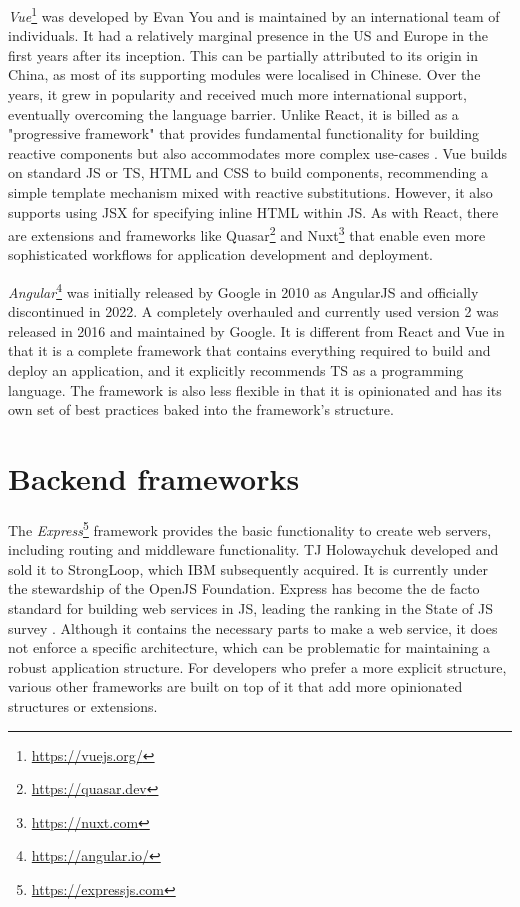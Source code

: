 \emph{Vue}\footnote{\url{https://vuejs.org/}} was developed by Evan You and is maintained by an international team of individuals. It had a relatively marginal presence in the US and Europe in the first years after its inception. This can be partially attributed to its origin in China, as most of its supporting modules were localised in Chinese. Over the years, it grew in popularity and received much more international support, eventually overcoming the language barrier. Unlike React, it is billed as a "progressive framework" that provides fundamental functionality for building reactive components but also accommodates more complex use-cases \parencite{vueProgressiveFramework}. Vue builds on standard \ac{JS} or \ac{TS}, \ac{HTML} and \ac{CSS} to build components, recommending a simple template mechanism mixed with reactive substitutions. However, it also supports using \ac{JSX} for specifying inline \ac{HTML} within \ac{JS}. As with React, there are extensions and frameworks like Quasar\footnote{\url{https://quasar.dev}} and Nuxt\footnote{\url{https://nuxt.com}} that enable even more sophisticated workflows for application development and deployment.

\emph{Angular}\footnote{\url{https://angular.io/}} was initially released by Google in 2010 as AngularJS and officially discontinued in 2022. A completely overhauled and currently used version 2 was released in 2016 and maintained by Google. It is different from React and Vue in that it is a complete framework that contains everything required to build and deploy an application, and it explicitly recommends \ac{TS} as a programming language. The framework is also less flexible in that it is opinionated and has its own set of best practices baked into the framework's structure.




\section{Backend frameworks}

The \emph{Express}\footnote{\url{https://expressjs.com}} framework provides the basic functionality to create web servers, including routing and middleware functionality. TJ Holowaychuk developed and sold it to StrongLoop, which IBM subsequently acquired. It is currently under the stewardship of the OpenJS Foundation. Express has become the de facto standard for building web services in JS, leading the ranking in the State of JS survey \parencite{mostUsedBackendFrameworks22}. Although it contains the necessary parts to make a web service, it does not enforce a specific architecture, which can be problematic for maintaining a robust application structure. For developers who prefer a more explicit structure, various other frameworks are built on top of it that add more opinionated structures or extensions.

